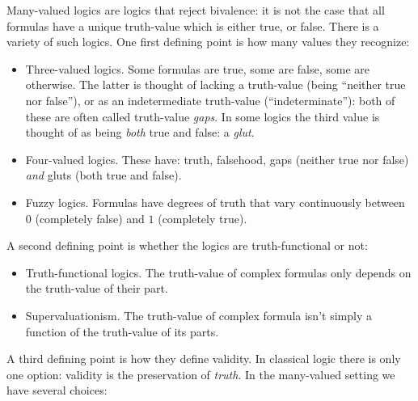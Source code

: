 \documentclass[../../../include/open-logic-section]{subfiles}
\begin{document}


Many-valued logics are logics that reject bivalence: it is not the case that all formulas have a unique truth-value which is either true, or false. There is a variety of such logics. One first defining point is how many values they recognize:

\begin{itemize}
	\item Three-valued logics. Some formulas are true, some are false, some are otherwise. The latter is thought of lacking a truth-value (being ``neither true nor false''), or as an indetermediate truth-value (``indeterminate''): both of these are often called truth-value \emph{gaps}. In some logics the third value is thought of as being \emph{both} true and false: a \emph{glut}.
	\item Four-valued logics. These have: truth, falsehood, gaps (neither true nor false) \emph{and} gluts (both true and false).
	\item Fuzzy logics. Formulas have degrees of truth that vary continuously between $0$ (completely false) and $1$ (completely true). 
\end{itemize}

A second defining point is whether the logics are truth-functional or not:

\begin{itemize}
	\item Truth-functional logics. The truth-value of complex formulas only depends on the truth-value of their part.
	\item Supervaluationism. The truth-value of complex formula isn't simply a function of the truth-value of its parts.
\end{itemize}

A third defining point is how they define validity. In classical logic there is only one option: validity is the preservation of \emph{truth}. In the many-valued setting we have several choices:
\end{document}
